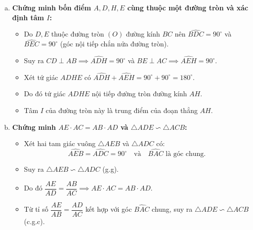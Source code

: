 \begin{ex}
{\begin{enumerate}[a)]
    \item \textbf{Chứng minh bốn điểm $A, D, H, E$ cùng thuộc một đường tròn và xác định tâm $I$:}
    \begin{itemize}
        \item Do $D, E$ thuộc đường tròn $(O)$ đường kính $BC$ nên $\widehat{BDC} = 90^\circ$ và $\widehat{BEC} = 90^\circ$ (góc nội tiếp chắn nửa đường tròn).
        \item Suy ra $CD \perp AB \implies \widehat{ADH} = 90^\circ$ và $BE \perp AC \implies \widehat{AEH} = 90^\circ$.
        \item Xét tứ giác $ADHE$ có $\widehat{ADH} + \widehat{AEH} = 90^\circ + 90^\circ = 180^\circ$.
        \item Do đó tứ giác $ADHE$ nội tiếp đường tròn đường kính $AH$.
        \item Tâm $I$ của đường tròn này là trung điểm của đoạn thẳng $AH$.
    \end{itemize}

    \item \textbf{Chứng minh $AE \cdot AC = AB \cdot AD$ và $\triangle ADE \backsim \triangle ACB$:}
    \begin{itemize}
        \item Xét hai tam giác vuông $\triangle AEB$ và $\triangle ADC$ có:
        \[
        \widehat{AEB} = \widehat{ADC} = 90^\circ \quad \text{và} \quad \widehat{BAC} \text{ là góc chung.}
        \]
        \item Suy ra $\triangle AEB \backsim \triangle ADC$ (g.g).
        \item Do đó $\dfrac{AE}{AD} = \dfrac{AB}{AC} \implies AE \cdot AC = AB \cdot AD$.
        \item Từ tỉ số $\dfrac{AE}{AB} = \dfrac{AD}{AC}$ kết hợp với góc $\widehat{BAC}$ chung, suy ra $\triangle ADE \backsim \triangle ACB$ (c.g.c).
    \end{itemize}


\end{enumerate}}
\end{ex}

